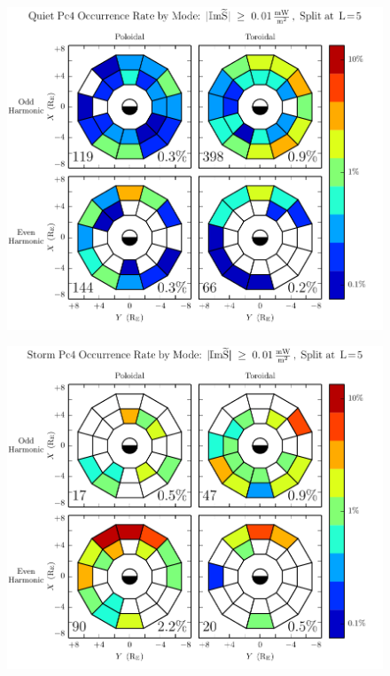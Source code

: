 \begin{figure}[!htb]
    \centering
    \includegraphics[width=\textwidth]{figures/mode_calm.pdf}
    \caption[Pc4 Rate by Mode: Dst$\geq \SI{-30}{\nT}$]{
      \todo{$\cdots$}
    }
    \label{fig_mode_calm}
\end{figure}

\begin{figure}[!htb]
    \centering
    \includegraphics[width=\textwidth]{figures/mode_storm.pdf}
    \caption[Pc4 Rate by Mode: Dst$< \SI{-30}{\nT}$]{
    }
    \label{fig_mode_storm}
\end{figure}

